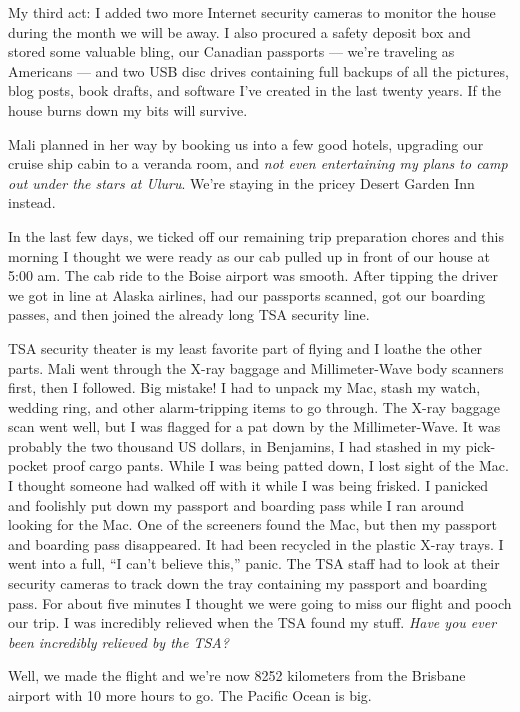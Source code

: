 My third act: I added two more Internet security cameras to monitor the
house during the month we will be away. I also procured a safety deposit
box and stored some valuable bling, our Canadian passports --- we're
traveling as Americans --- and two USB disc drives containing full
backups of all the pictures, blog posts, book drafts, and software I've
created in the last twenty years. If the house burns down my bits will
survive.

Mali planned in her way by booking us into a few good hotels, upgrading
our cruise ship cabin to a veranda room, and \emph{not even entertaining
my plans to camp out under the stars at Uluru}. We're staying in the
pricey Desert Garden Inn instead.

In the last few days, we ticked off our remaining trip preparation
chores and this morning I thought we were ready as our cab pulled up in
front of our house at 5:00 am. The cab ride to the Boise airport was
smooth. After tipping the driver we got in line at Alaska airlines, had
our passports scanned, got our boarding passes, and then joined the
already long TSA security line.

TSA security theater is my least favorite part of flying and I loathe
the other parts. Mali went through the X-ray baggage and Millimeter-Wave
body scanners first, then I followed. Big mistake! I had to unpack my
Mac, stash my watch, wedding ring, and other alarm-tripping items to go
through. The X-ray baggage scan went well, but I was flagged for a pat
down by the Millimeter-Wave. It was probably the two thousand US
dollars, in Benjamins, I had stashed in my pick-pocket proof cargo
pants. While I was being patted down, I lost sight of the Mac. I thought
someone had walked off with it while I was being frisked. I panicked and
foolishly put down my passport and boarding pass while I ran around
looking for the Mac. One of the screeners found the Mac, but then my
passport and boarding pass disappeared. It had been recycled in the
plastic X-ray trays. I went into a full, ``I can't believe this,''
panic. The TSA staff had to look at their security cameras to track down
the tray containing my passport and boarding pass. For about five
minutes I thought we were going to miss our flight and pooch our trip. I
was incredibly relieved when the TSA found my stuff. \emph{Have you ever
been incredibly relieved by the TSA?}

Well, we made the flight and we're now 8252 kilometers from the Brisbane
airport with 10 more hours to go. The Pacific Ocean is big.

